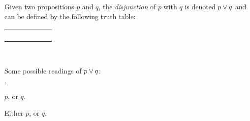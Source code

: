 \begin{definition}[Disjunction]
    \begin{minipage}[t]{.55\linewidth}
        Given two propositions $p$ and $q$, the \emph{disjunction} of $p$ with $q$
        is denoted $p \vee q$ and can be defined by the following truth table:
        \begin{table}[H]
            \centering
            \label{tab:or}
            \begin{tabular}{|CcCc||Cc|} \hline
                 &  &  \\ \hline
                \thead{$\top$} & \thead{$\top$} &  \\
                \thead{$\top$} & \thead{$\bot$} &  \\
                \thead{$\bot$} & \thead{$\top$} &  \\
                \thead{$\bot$} & \thead{$\bot$} &  \\ \hline
            \end{tabular}
        \end{table}
    \end{minipage}%
    \begin{minipage}[t]{.05\linewidth}
        ~
    \end{minipage}%
    \begin{minipage}[t]{.4\linewidth}
        Some possible readings of $p \vee q$:\\
        \begin{list}{$\cdot$}{}
            \item
                $p$, or $q$.
            \item
                Either $p$, or $q$.
        \end{list}
    \end{minipage}
\end{definition}

